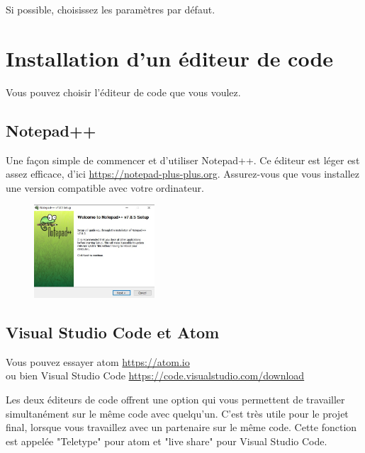 \documentclass{article}
\begin{document}
Si possible, choisissez les paramètres par défaut.

\section{Installation d'un éditeur de code}
Vous pouvez choisir l'éditeur de code que vous voulez. 
\subsection{Notepad++}
Une façon simple de commencer et d’utiliser Notepad++. Ce éditeur est léger est assez efficace, d'ici \href{https://notepad-plus-plus.org}{https://notepad-plus-plus.org}. Assurez-vous que vous installez une version compatible avec votre ordinateur.
\begin{figure}[H]
\center
\includegraphics[width=0.4\textwidth]{Plots/Editor_1.jpg}
\end{figure}
\subsection{Visual Studio Code et Atom}
Vous pouvez essayer atom \href{https://atom.io}{https://atom.io}\\
ou bien Visual Studio Code \href{https://code.visualstudio.com/download}{https://code.visualstudio.com/download}

Les deux éditeurs de code offrent une option qui vous permettent de travailler simultanément sur le même code avec quelqu'un. C'est très utile pour le projet final, lorsque vous travaillez avec un partenaire sur le même code. Cette fonction est appelée "Teletype" pour atom et "live share" pour Visual Studio Code.
\end{document}
